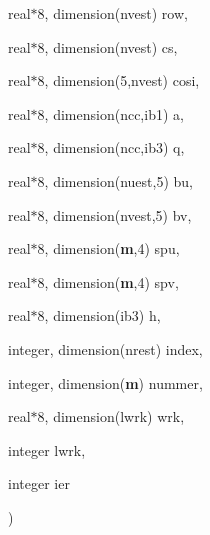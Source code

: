 {\begin{DoxyParamCaption}
\item[{real$\ast$8, dimension(nvest)}]{row, }
\item[{real$\ast$8, dimension(nvest)}]{cs, }
\item[{real$\ast$8, dimension(5,nvest)}]{cosi, }
\item[{real$\ast$8, dimension(ncc,ib1)}]{a, }
\item[{real$\ast$8, dimension(ncc,ib3)}]{q, }
\item[{real$\ast$8, dimension(nuest,5)}]{bu, }
\item[{real$\ast$8, dimension(nvest,5)}]{bv, }
\item[{real$\ast$8, dimension({\bf m},4)}]{spu, }
\item[{real$\ast$8, dimension({\bf m},4)}]{spv, }
\item[{real$\ast$8, dimension(ib3)}]{h, }
\item[{integer, dimension(nrest)}]{index, }
\item[{integer, dimension({\bf m})}]{nummer, }
\item[{real$\ast$8, dimension(lwrk)}]{wrk, }
\item[{integer}]{lwrk, }
\item[{integer}]{ier}
\end{DoxyParamCaption}
)}\label{fppola_8f_a0a75676271364d135517cefe4bad1663}
